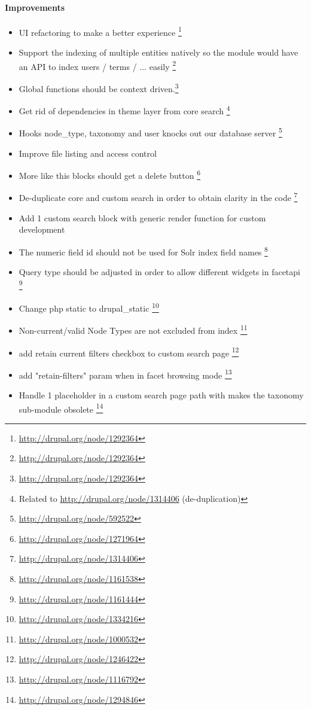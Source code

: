 \paragraph{Improvements}
\begin{itemize}
\item UI refactoring to make a better experience \footnote{\url{http://drupal.org/node/1292364}}
\item Support the indexing of multiple entities natively so the module would have an API to index users / terms / ... easily \footnote{\url{http://drupal.org/node/1292364}}
\item Global functions should be context driven.\footnote{\url{http://drupal.org/node/1292364}}
\item Get rid of dependencies in theme layer from core search \footnote{Related to \url{http://drupal.org/node/1314406} (de-duplication)}
\item Hooks node\_type, taxonomy and user knocks out our database server \footnote{\url{http://drupal.org/node/592522}}
\item Improve file listing and access control
\item More like this blocks should get a delete button \footnote{\url{http://drupal.org/node/1271964}}
\item De-duplicate core and custom search in order to obtain clarity in the code \footnote{\url{http://drupal.org/node/1314406}}
\item Add 1 custom search block with generic render function for custom development
\item The numeric field id should not be used for Solr index field names \footnote{\url{http://drupal.org/node/1161538}}
\item Query type should be adjusted in order to allow different widgets in facetapi \footnote{\url{http://drupal.org/node/1161444}}
\item Change php static to drupal\_static \footnote{\url{http://drupal.org/node/1334216}}
\item Non-current/valid Node Types are not excluded from index \footnote{\url{http://drupal.org/node/1000532}}
\item add retain current filters checkbox to custom search page \footnote{\url{http://drupal.org/node/1246422}}
\item add "retain-filters" param when in facet browsing mode \footnote{\url{http://drupal.org/node/1116792}}
\item Handle 1 placeholder in a custom search page path with makes the taxonomy sub-module obsolete \footnote{\url{http://drupal.org/node/1294846}}

\end{itemize}
